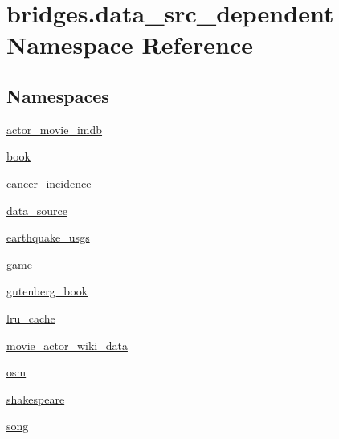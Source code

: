 \hypertarget{namespacebridges_1_1data__src__dependent}{}\section{bridges.\+data\+\_\+src\+\_\+dependent Namespace Reference}
\label{namespacebridges_1_1data__src__dependent}
\subsection*{Namespaces}
\begin{DoxyCompactItemize}
\item 
 \mbox{\hyperlink{namespacebridges_1_1data__src__dependent_1_1actor__movie__imdb}{actor\+\_\+movie\+\_\+imdb}}
\item 
 \mbox{\hyperlink{namespacebridges_1_1data__src__dependent_1_1book}{book}}
\item 
 \mbox{\hyperlink{namespacebridges_1_1data__src__dependent_1_1cancer__incidence}{cancer\+\_\+incidence}}
\item 
 \mbox{\hyperlink{namespacebridges_1_1data__src__dependent_1_1data__source}{data\+\_\+source}}
\item 
 \mbox{\hyperlink{namespacebridges_1_1data__src__dependent_1_1earthquake__usgs}{earthquake\+\_\+usgs}}
\item 
 \mbox{\hyperlink{namespacebridges_1_1data__src__dependent_1_1game}{game}}
\item 
 \mbox{\hyperlink{namespacebridges_1_1data__src__dependent_1_1gutenberg__book}{gutenberg\+\_\+book}}
\item 
 \mbox{\hyperlink{namespacebridges_1_1data__src__dependent_1_1lru__cache}{lru\+\_\+cache}}
\item 
 \mbox{\hyperlink{namespacebridges_1_1data__src__dependent_1_1movie__actor__wiki__data}{movie\+\_\+actor\+\_\+wiki\+\_\+data}}
\item 
 \mbox{\hyperlink{namespacebridges_1_1data__src__dependent_1_1osm}{osm}}
\item 
 \mbox{\hyperlink{namespacebridges_1_1data__src__dependent_1_1shakespeare}{shakespeare}}
\item 
 \mbox{\hyperlink{namespacebridges_1_1data__src__dependent_1_1song}{song}}
\end{DoxyCompactItemize}
